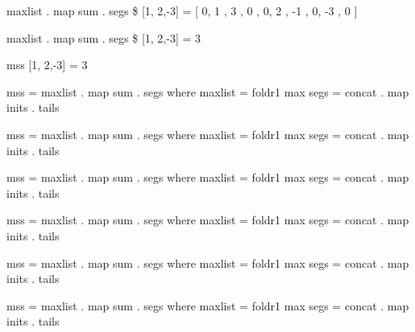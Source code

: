 \documentclass{beamer}
\newcommand{\ca}[1]{{\color{blue}#1}}
\newcommand{\cb}[1]{{\color{violet}#1}}
\begin{document}
\begin{frame}[fragile,t]
\begin{center}
\begin{overprint}
\begin{semiverbatim}
  \cb{maxlist . map sum . segs} \$ [1, 2,-3] = 
  [    0,  1 ,    \ca{3} ,       0   , 
       0,  2 ,   -1   , 
       0, -3  , 
       0   ]
\end{semiverbatim}

\begin{semiverbatim}
  \cb{maxlist . map sum . segs} \$ [1, 2,-3] = 3
\end{semiverbatim}

\begin{semiverbatim}
                         \cb{mss} [1, 2,-3] = 3
\end{semiverbatim}

\end{overprint}
\end{center}

\vspace{10pt}

\begin{overprint}
    
\begin{semiverbatim}
mss = maxlist . map sum . segs
  where
    maxlist = foldr1 max
    segs = concat . map inits . tails
\end{semiverbatim}

\begin{semiverbatim}
mss = maxlist . map sum . segs
  where
    maxlist = foldr1 max
    segs = concat . map inits . \cb{tails}
\end{semiverbatim}

\begin{semiverbatim}
mss = maxlist . map sum . segs
  where
    maxlist = foldr1 max
    segs = concat . \cb{map inits . tails}
\end{semiverbatim}

\begin{semiverbatim}
mss = maxlist . map sum . segs
  where
    maxlist = foldr1 max
    segs = \cb{concat . map inits . tails}
\end{semiverbatim}

\begin{semiverbatim}
mss = maxlist . map sum . \cb{segs}
  where
    maxlist = foldr1 max
    segs = concat . map inits . tails
\end{semiverbatim}

\begin{semiverbatim}
mss = maxlist . \cb{map sum . segs}
  where
    maxlist = foldr1 max
    segs = concat . map inits . tails
\end{semiverbatim}


\end{overprint}
\end{frame}
\end{document}
